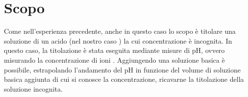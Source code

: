 \section*{Scopo}

Come nell'esperienza precedente, anche in questo caso lo scopo è titolare una
soluzione di un acido (nel nostro caso ) la cui concentrazione è incognita.
In questo caso, la titolazione è stata eseguita mediante misure di pH, ovvero misurando la concentrazione di ioni .
Aggiungendo una soluzione basica è possibile, estrapolando l'andamento del pH in funzione del volume di soluzione basica aggiunta di cui si conosce la concentrazione, ricavarne la titolazione della soluzione incognita.
